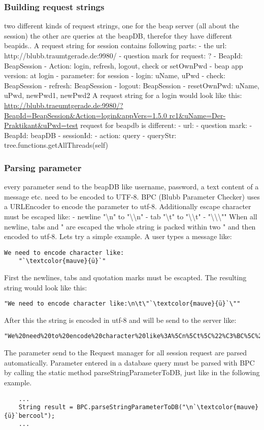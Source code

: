 \documentclass[12pt,a4paper,oneside]{report}
\begin{document}
\subsubsection{Building request strings}
two different kinds of request strings, one for the beap server (all about the session) the other are queries at the beapDB, therefor they have different beapids..
A request string for session contains following parts:
 	- the url: http://blubb.traumtgerade.de:9980/
 	- question mark for request: ?
 	- BeapId: BeapSession 
 	- Action: login, refresh, logout, check or setOwnPwd 
 	- beap app version: at login
 	- parameter: for session
 		- login: uName, uPwd
 		- check: BeapSession
 		- refresh: BeapSession
 		- logout: BeapSession
 		- resetOwnPwd: uName, uPwd, newPwd1, newPwd2
A request string for a login would look like this:
\url{http://blubb.traeumtgerade.de:9980/?BeapId=BeapSession&Action=login&appVers=1.5.0 rc1&uName=Der-Praktikant&uPwd=test}
request for beapdb is different:
	- url:
	- question mark:
	- BeapId: beapDB
	- sessionId:
	- action: query
	- queryStr: tree.functions.getAllThreads(self)


 \subsubsection{Parsing parameter}
every parameter send to the beapDB like username, password, a text content of a message etc. need to be encoded to UTF-8.
BPC (Blubb Parameter Checker) uses a URLEncoder to encode the parameter to utf-8. 
Additionally escape character must be escaped like:
	- newline "\textbackslash n" to "\textbackslash \textbackslash n"
	- tab "\textbackslash t" to "\textbackslash \textbackslash t"
	- "\textbackslash \textbackslash \textbackslash ""
When all newline, tabs and " are escaped the whole string is packed within two " and then encoded to utf-8.
Lets try a simple example. A user types a message like:
\begin{lstlisting}
We need to encode character like:
	"`\textcolor{mauve}{ü}`"
\end{lstlisting}
First the newlines, tabs and quotation marks must be escapted. The resulting string would look like this:
\begin{lstlisting}
"We need to encode character like:\n\t\"`\textcolor{mauve}{ü}`\""
\end{lstlisting}
After this the string is encoded in utf-8 and will be send to the server like:
\begin{lstlisting}
"We%20need%20to%20encode%20character%20like%3A%5Cn%5Ct%5C%22%C3%BC%5C%22"
\end{lstlisting}
The parameter send to the Request manager for all session request are parsed automatically. Parameter entered in a database query must be parsed with BPC by calling the static method parseStringParameterToDB, just like in the following example.
\begin{lstlisting}
	...
	String result = BPC.parseStringParameterToDB("\n`\textcolor{mauve}{ü}`bercool");
	...
\end{lstlisting}
\end{document}
